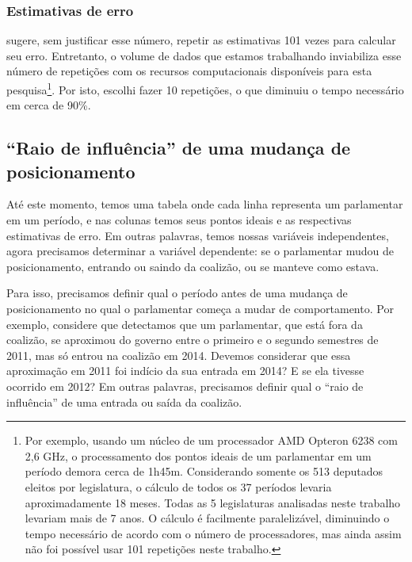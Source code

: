 \documentclass[a4paper,titlepage]{ppgi}\usepackage[]{graphicx}\usepackage[]{color}
\begin{document}
\subsubsection{Estimativas de erro}
\label{cap:miolo:estimativas-de-erro}

 sugere, sem justificar esse número, repetir as
estimativas 101 vezes para calcular seu erro. Entretanto, o volume de dados que
estamos trabalhando inviabiliza esse número de repetições com os recursos
computacionais disponíveis para esta pesquisa\footnote{Por exemplo, usando um
núcleo de um processador AMD Opteron\texttrademark{} 6238 com 2,6 GHz, o
processamento dos pontos ideais de um parlamentar em um período demora cerca de
1h45m. Considerando somente os 513 deputados eleitos por legislatura, o
cálculo de todos os 37 períodos levaria aproximadamente 18 meses. Todas as 5
legislaturas analisadas neste trabalho levariam mais de 7 anos. O cálculo é
facilmente paralelizável, diminuindo o tempo necessário de acordo com o número
de processadores, mas ainda assim não foi possível usar 101 repetições neste
trabalho.}. Por isto, escolhi fazer 10 repetições, o que diminuiu o tempo
necessário em cerca de 90\%.

\subsection{``Raio de influência'' de uma mudança de posicionamento}
\label{cap:desenvolvimento:raio-de-influencia}

Até este momento, temos uma tabela onde cada linha representa um parlamentar em
um período, e nas colunas temos seus pontos ideais e as respectivas estimativas
de erro. Em outras palavras, temos nossas variáveis independentes, agora
precisamos determinar a variável dependente: se o parlamentar mudou de
posicionamento, entrando ou saindo da coalizão, ou se manteve como estava.

Para isso, precisamos definir qual o período antes de uma mudança de
posicionamento no qual o parlamentar começa a mudar de comportamento. Por
exemplo, considere que detectamos que um parlamentar, que está fora da
coalizão, se aproximou do governo entre o primeiro e o segundo semestres de
2011, mas só entrou na coalizão em 2014. Devemos considerar que essa
aproximação em 2011 foi indício da sua entrada em 2014? E se ela tivesse
ocorrido em 2012?  Em outras palavras, precisamos definir qual o ``raio de
influência'' de uma entrada ou saída da coalizão.
\end{document}
